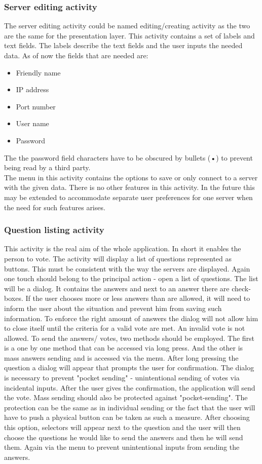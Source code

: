 \documentclass[11pt]{article} %
\begin{document}
\subsubsection{Server editing activity}
The server editing activity could be named editing/creating activity as the two are the same for the presentation layer. This activity contains a set of labels and text fields. The labels describe the text fields and the user inputs the needed data. As of now the fields that are needed are:
\begin{itemize}
\item Friendly name
\item IP address
\item Port number
\item User name
\item Password
\end{itemize}
The the password field characters have to be obscured by bullets (•) to prevent being read by a third party.\\
The menu in this activity contains the options to save or only connect to a server with the given data. There is no other features in this activity. In the future this may be extended to accommodate separate user preferences for one server when the need for such features arises.  

\subsubsection{Question listing activity}
This activity is the real aim of the whole application. In short it enables the person to vote. The activity will display a list of questions represented as buttons. This must be consistent with the way the servers are displayed. Again one touch should belong to  the principal action - open a list of questions. The list will be a dialog. It contains the answers and next to an answer there are check-boxes. If the user chooses more or less answers than are allowed, it will need to inform the user about the situation and prevent him from saving such information. To enforce the right amount of answers the dialog will not allow him to close itself until the criteria for a valid vote are met. An invalid vote is not allowed. To send the answers/ votes, two methods should be employed. The first is a one by one method that can be accessed via long press. And the other is mass answers sending and is accessed via the menu. After long pressing the question a dialog will appear that prompts the user for confirmation. The dialog is necessary to prevent "pocket sending" - unintentional sending of votes via incidental inputs. After the user gives the confirmation, the application will send the vote. Mass sending should also be protected against "pocket-sending". The protection can be the same as in individual sending or the fact that the user will have to push a physical button can be taken as such a measure. After choosing this option, selectors will appear next to the question and the user will then choose the questions he would like to send the answers and then he will send them. Again via the menu to prevent unintentional inputs from sending the answers.
\end{document}
